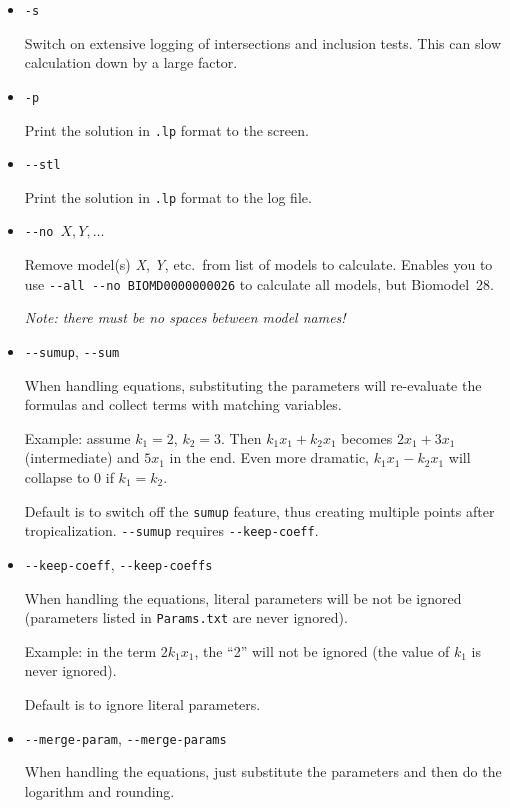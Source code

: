 \documentclass[a4paper,11pt]{article}
\begin{document}
\begin{itemize}
\item \texttt{-s}\par
Switch on extensive logging of intersections and inclusion tests.
This can slow calculation down by a large factor.

\item \texttt{-p}\par
Print the solution in \texttt{.lp} format to the screen.

\item \texttt{-{}-stl}\par
Print the solution in \texttt{.lp} format to the log file.

\item \texttt{-{}-no}~$X,Y,\ldots$\par
Remove model(s) \emph{X}, \emph{Y}, etc.\ from list of models to calculate.
Enables you to use \texttt{-{}-all -{}-no BIOMD0000000026} to calculate all models,
but Biomodel~28.

\emph{Note: there must be no spaces between model names!}

\item \texttt{-{}-sumup}, \texttt{-{}-sum}\par
When handling equations, substituting the parameters will re-evaluate the formulas
and collect terms with matching variables.

Example: assume $k_1=2$, $k_2=3$.
Then $k_1 x_1 + k_2 x_1$ becomes
$2 x_1 + 3 x_1$ (intermediate) and $5 x_1$ in the end.  Even more dramatic, $k_1 x_1 - k_2 x_1$
will collapse to $0$ if $k_1 = k_2$.

Default is to switch off the \texttt{sumup} feature, thus creating multiple points after
tropicalization.
\texttt{-{}-sumup} requires \texttt{-{}-keep-coeff}.

\item \texttt{-{}-keep-coeff}, \texttt{-{}-keep-coeffs}\par
When handling the equations, literal parameters will be not be ignored
(parameters listed in \texttt{Params.txt} are never ignored).

Example: in the term $2 k_1 x_1$, the ``2'' will not be ignored (the value of $k_1$
is never ignored).

Default is to ignore literal parameters.

\item \texttt{-{}-merge-param}, \texttt{-{}-merge-params}\par
When handling the equations, just substitute the parameters and then do the logarithm and rounding.


\end{itemize}
\end{document}
